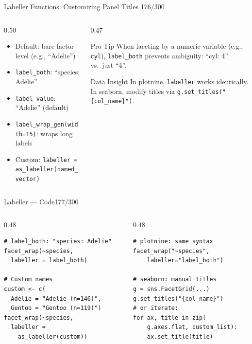 \documentclass[10pt]{beamer}
\newcommand{\smark}[1]{\hfill{\scriptsize\color{codegray}#1}}
\begin{document}
\begin{frame}{Labeller Functions: Customizing Panel Titles}
\smark{176/300}
\begin{columns}[T]
\begin{column}{0.50\textwidth}
\begin{itemize}
    \item Default: bare factor level (e.g., ``Adelie'')
    \item \texttt{label\_both}: ``species: Adelie''
    \item \texttt{label\_value}: ``Adelie'' (default)
    \item \texttt{label\_wrap\_gen(width=15)}: wraps long labels
    \item Custom: \texttt{labeller = as\_labeller(named\_vector)}
\end{itemize}
\end{column}
\begin{column}{0.47\textwidth}
\begin{alertblock}{Pro-Tip}
    \scriptsize When faceting by a numeric variable (e.g., \texttt{cyl}), \texttt{label\_both} prevents ambiguity: ``cyl: 4'' vs.\ just ``4''.
\end{alertblock}
\vspace{0.2cm}
\begin{exampleblock}{Data Insight}
    \scriptsize In plotnine, \texttt{labeller} works identically. In seaborn, modify titles via \texttt{g.set\_titles("\{col\_name\}")}.
\end{exampleblock}
\end{column}
\end{columns}
\end{frame}

\begin{frame}[fragile]{Labeller --- Code}\smark{177/300}
\begin{columns}[T]
\begin{column}{0.48\textwidth}
\begin{lstlisting}[style=Rstyle]
# label_both: "species: Adelie"
facet_wrap(~species,
  labeller = label_both)

# Custom names
custom <- c(
  Adelie = "Adelie (n=146)",
  Gentoo = "Gentoo (n=119)")
facet_wrap(~species,
  labeller =
    as_labeller(custom))
\end{lstlisting}
\end{column}
\begin{column}{0.48\textwidth}
\begin{lstlisting}[style=Pystyle]
# plotnine: same syntax
facet_wrap("~species",
    labeller="label_both")

# seaborn: manual titles
g = sns.FacetGrid(...)
g.set_titles("{col_name}")
# or iterate:
for ax, title in zip(
    g.axes.flat, custom_list):
    ax.set_title(title)
\end{lstlisting}
\end{column}
\end{columns}
\end{frame}
\end{document}
